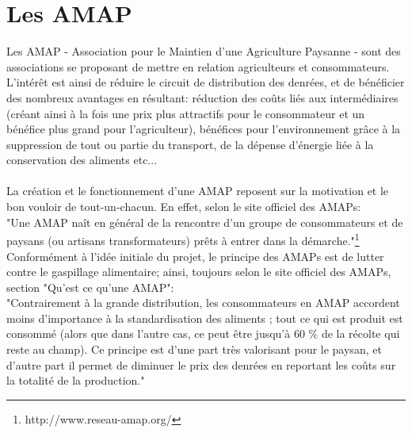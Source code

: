 \section*{Les AMAP}
Les AMAP - Association pour le Maintien d'une Agriculture Paysanne - sont des associations se proposant de mettre en relation agriculteurs et consommateurs. L'intérêt est ainsi de réduire le circuit de distribution des denrées, et de bénéficier des nombreux avantages en résultant: réduction des coûts liés aux intermédiaires (créant ainsi à la fois une prix plus attractifs pour le consommateur et un bénéfice plus grand pour l'agriculteur), bénéfices pour l'environnement grâce à la suppression de tout ou partie du transport, de la dépense d'énergie liée à la conservation des aliments etc...\\ \\
La création et le fonctionnement d'une AMAP reposent sur la motivation et le bon vouloir de tout-un-chacun. En effet, selon le site officiel des AMAPs:\\
"Une AMAP naît en général de la rencontre d'un groupe de consommateurs et de paysans (ou artisans transformateurs) prêts à entrer dans la démarche."\footnote{http://www.reseau-amap.org/}\\

Conformément à l'idée initiale du projet, le principe des AMAPs est de lutter contre le gaspillage alimentaire; ainsi, toujours selon le site officiel des AMAPs, section "Qu'est ce qu'une AMAP": \\
"Contrairement à la grande distribution, les consommateurs en AMAP accordent moins d'importance à la standardisation des aliments ; tout ce qui est produit est consommé (alors que dans l'autre cas, ce peut être jusqu'à 60 \% de la récolte qui reste au champ). Ce principe est d'une part très valorisant pour le paysan, et d'autre part il permet de diminuer le prix des denrées en reportant les coûts sur la totalité de la production."


